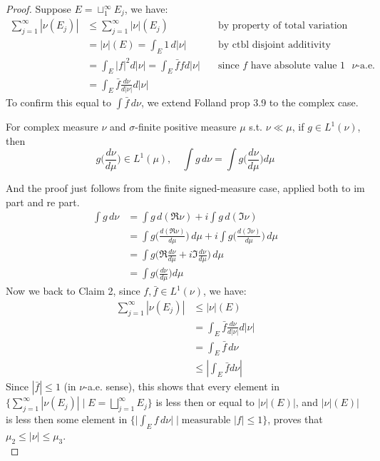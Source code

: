 \documentclass[lang=cn,11pt]{elegantbook}
\begin{document}
\begin{proof}
Suppose $E=\sqcup_1^{\infty} E_j$, we have:
$$
\begin{aligned}
\sum_{j=1}^{\infty}\left|\nu\left(E_j\right)\right| & \leq \sum_{j=1}^{\infty}|\nu|\left(E_j\right)  \quad &\text{by property of total variation measure}\\
& =|\nu|(E)=\int_E 1 \,d|\nu| \quad &\text{by ctbl disjoint additivity }\\
& =\int_E|f|^2 d|\nu|  =\int_E \bar{f} f d|\nu|\quad &\text{since $f$ have absolute value $1$  $\nu$-a.e.}\\
& =\int_E \bar{f} \frac{d \nu}{d|\nu|}  d|\nu|
\end{aligned}
$$
To confirm this equal to $\int \bar{f}\, d\nu$, we extend Folland prop 3.9 to the complex case.
\begin{proposition}
For complex measure $\nu$ and $\sigma$-finite positive measure $\mu$ s.t. $\nu \ll \mu$, if $g\in L^1(\nu)$, then \[
g\bigg(\frac{d\nu}{d\mu}\bigg) \in L^1(\mu),\quad \int g \,d\nu =  \int g\bigg(\frac{d\nu}{d\mu}\bigg)  d\mu
\]
\end{proposition}
And the proof just follows from the finite signed-measure case, applied both to im part and re part.
\begin{align*}
\int g \,d\nu  &= \int g \, d(\Re \nu ) + i \int g\, d(\Im \nu)    \\
& = \int g \bigg( \frac{d (\Re\nu)}{d\mu}\bigg)\, d\mu + i \int g\bigg( \frac{d (\Im\nu)}{d\mu}\bigg)\, d\mu\\
& =  \int g \bigg( \Re\frac{d \nu}{d\mu} +  i\Im\frac{d \nu}{d\mu}   \bigg)\, d\mu\\
& = \int g\bigg(\frac{d\nu}{d\mu}\bigg)  d\mu
\end{align*}
Now we back to Claim 2, since $f,\bar{f} \in L^1(\nu) $, we have: 
\begin{align*}
\sum_{j=1}^{\infty}|\nu\left(E_j\right)| & \leq |\nu|(E) \\
& =\int_E \bar{f} \frac{d \nu}{d|\nu|}  d|\nu|\\
& = \int_E  \bar{f} \, d\nu \\
& \leq \left|\int_E \bar{f} d \nu\right|
\end{align*}
Since $|\bar{f}| \leq 1$ (in $\nu$-a.e. sense), this shows that every element in $\{\sum_{j=1}^\infty|\nu(E_j)|\mid E=\bigsqcup_{j=1}^\infty E_j\}$ is less then or equal to $|\nu| (E)|$, and $|\nu| (E)|$ is less then some element in $\{\big|\int_E f\,d\nu\big|\mid \text{measurable }|f|\le 1\}$,  proves that $\mu_2 \leq|\nu| \leq \mu_3$.\\

\end{proof}
\end{document}
